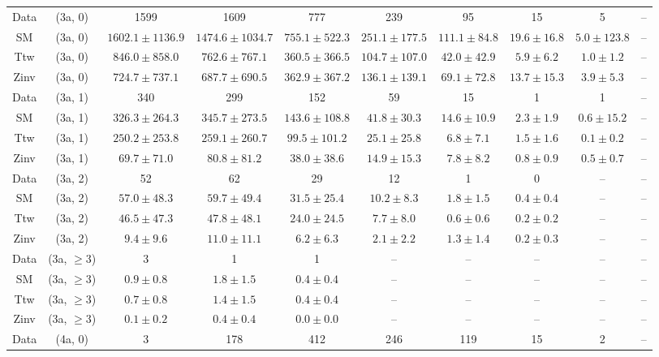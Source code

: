 \begin{table}[h!]
{\begin{tabular}{cccccccccc}
	Data & (3a, 0) & 1599 & 1609 & 777 & 239 & 95 & 15 & 5 & -- \\[0.5ex] 
	SM & (3a, 0) & $1602.1\pm 1136.9$ & $1474.6\pm 1034.7$ & $755.1\pm 522.3$ & $251.1\pm 177.5$ & $111.1\pm 84.8$ & $19.6\pm 16.8$ & $5.0\pm 123.8$ & -- \\[0.5ex] 
	Ttw & (3a, 0) & $846.0\pm 858.0$ & $762.6\pm 767.1$ & $360.5\pm 366.5$ & $104.7\pm 107.0$ & $42.0\pm 42.9$ & $5.9\pm 6.2$ & $1.0\pm 1.2$ & -- \\[0.5ex] 
	Zinv & (3a, 0) & $724.7\pm 737.1$ & $687.7\pm 690.5$ & $362.9\pm 367.2$ & $136.1\pm 139.1$ & $69.1\pm 72.8$ & $13.7\pm 15.3$ & $3.9\pm 5.3$ & -- \\[0.5ex] 
	Data & (3a, 1) & 340 & 299 & 152 & 59 & 15 & 1 & 1 & -- \\[0.5ex] 
	SM & (3a, 1) & $326.3\pm 264.3$ & $345.7\pm 273.5$ & $143.6\pm 108.8$ & $41.8\pm 30.3$ & $14.6\pm 10.9$ & $2.3\pm 1.9$ & $0.6\pm 15.2$ & -- \\[0.5ex] 
	Ttw & (3a, 1) & $250.2\pm 253.8$ & $259.1\pm 260.7$ & $99.5\pm 101.2$ & $25.1\pm 25.8$ & $6.8\pm 7.1$ & $1.5\pm 1.6$ & $0.1\pm 0.2$ & -- \\[0.5ex] 
	Zinv & (3a, 1) & $69.7\pm 71.0$ & $80.8\pm 81.2$ & $38.0\pm 38.6$ & $14.9\pm 15.3$ & $7.8\pm 8.2$ & $0.8\pm 0.9$ & $0.5\pm 0.7$ & -- \\[0.5ex] 
	Data & (3a, 2) & 52 & 62 & 29 & 12 & 1 & 0 & -- & -- \\[0.5ex] 
	SM & (3a, 2) & $57.0\pm 48.3$ & $59.7\pm 49.4$ & $31.5\pm 25.4$ & $10.2\pm 8.3$ & $1.8\pm 1.5$ & $0.4\pm 0.4$ & -- & -- \\[0.5ex] 
	Ttw & (3a, 2) & $46.5\pm 47.3$ & $47.8\pm 48.1$ & $24.0\pm 24.5$ & $7.7\pm 8.0$ & $0.6\pm 0.6$ & $0.2\pm 0.2$ & -- & -- \\[0.5ex] 
	Zinv & (3a, 2) & $9.4\pm 9.6$ & $11.0\pm 11.1$ & $6.2\pm 6.3$ & $2.1\pm 2.2$ & $1.3\pm 1.4$ & $0.2\pm 0.3$ & -- & -- \\[0.5ex] 
	Data & (3a, $\ge3$) & 3 & 1 & 1 & -- & -- & -- & -- & -- \\[0.5ex] 
	SM & (3a, $\ge3$) & $0.9\pm 0.8$ & $1.8\pm 1.5$ & $0.4\pm 0.4$ & -- & -- & -- & -- & -- \\[0.5ex] 
	Ttw & (3a, $\ge3$) & $0.7\pm 0.8$ & $1.4\pm 1.5$ & $0.4\pm 0.4$ & -- & -- & -- & -- & -- \\[0.5ex] 
	Zinv & (3a, $\ge3$) & $0.1\pm 0.2$ & $0.4\pm 0.4$ & $0.0\pm 0.0$ & -- & -- & -- & -- & -- \\[0.5ex] 
	Data & (4a, 0) & 3 & 178 & 412 & 246 & 119 & 15 & 2 & -- \\[0.5ex] 

\end{tabular}}
\end{table}
